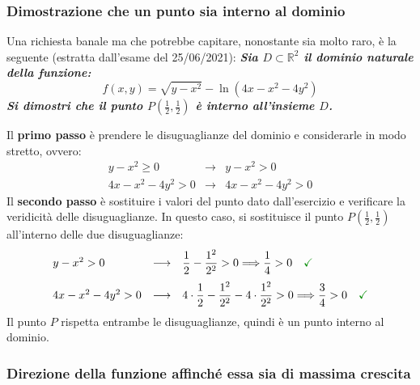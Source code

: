 \documentclass[a4paper]{article}
\begin{document}
	\subsubsection{Dimostrazione che un punto sia interno al dominio}

	Una richiesta banale ma che potrebbe capitare, nonostante sia molto raro, è la seguente (estratta dall'esame del 25/06/2021): \textcolor{Green4}{\textbf{\emph{Sia $D\subset\mathbb{R}^{2}$ il dominio naturale della funzione:}}
	\begin{equation*}
		f\left(x,y\right) = \sqrt{y-x^{2}}-\ln\left(4x-x^{2}-4y^{2}\right)
	\end{equation*}
	\textbf{\emph{Si dimostri che il punto $P\left(\frac{1}{2}, \frac{1}{2}\right)$ è interno all'insieme $D$.}}}\newline

	\noindent
	Il \textbf{primo passo} è prendere le disuguaglianze del dominio e considerarle in modo stretto, ovvero:
	\begin{equation*}
		\begin{array}{lcl}
			y-x^{2} \ge 0			& \longrightarrow & y-x^{2} > 0 \\
			4x - x^{2} - 4y^{2} > 0	& \longrightarrow & 4x - x^{2} - 4y^{2} > 0
		\end{array}
	\end{equation*}
	Il \textbf{secondo passo} è sostituire i valori del punto dato dall'esercizio e verificare la veridicità delle disuguaglianze. In questo caso, si sostituisce il punto $P\left(\frac{1}{2}, \frac{1}{2}\right)$ all'interno delle due disuguaglianze:
	\begin{equation*}
		\begin{array}{lcl}
			y -x^{2} > 0			& \longrightarrow & \dfrac{1}{2} - \dfrac{1^{2}}{2^{2}} > 0 \Longrightarrow \dfrac{1}{4} > 0 \hspace{1em} \textcolor{Green4}{\checkmark} \\ [1em]
			4x - x^{2} - 4y^{2} > 0	& \longrightarrow & 4 \cdot \dfrac{1}{2} - \dfrac{1^{2}}{2^{2}} - 4 \cdot \dfrac{1^{2}}{2^{2}} > 0 \Longrightarrow \dfrac{3}{4} > 0 \hspace{1em} \textcolor{Green4}{\checkmark}
		\end{array}
	\end{equation*}
	Il punto $P$ rispetta entrambe le disuguaglianze, quindi è un punto interno al dominio.\newpage

	\subsubsection{Direzione della funzione affinché essa sia di massima crescita}\label{par: direzione della funzione affinché essa sia di massima crescita}
\end{document}
